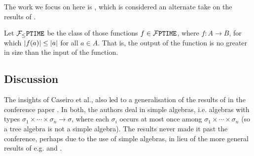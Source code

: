 The work we focus on here is \cite{aehlig-schwichtenberg-2002}, which is
considered an alternate take on the results of \cite{hofmann-2003}.

\begin{definition} Let $\mathcal{F}_{\leq}\mathtt{PTIME}{}$ be the class of those functions $f \in
\mathcal{F}\mathtt{PTIME}{}$, where $f : A \rightarrow B$, for which ${\mathopen{}\left|{f{\mathopen{}\left({a}\right)\mathclose{}}}\right|\mathclose{}} \leq
{\ensuremath{\mathopen{}\left|{a}\right|\mathclose{}}}$ for all $a \in A$. That is, the output of the function is no greater
in size than the input of the function. \end{definition}

\subsection{Discussion}

The insights of Caseiro et al., also led to a generalisation of the results of
\cite{marion-2003} in the conference paper \cite{marion-moyen-2000}. In both,
the authors deal in simple algebras, i.e.  algebras with types $\sigma_1 \times
\cdots \times \sigma_n \rightarrow \sigma$, where each $\sigma_i$ occurs at
most once among $\sigma_1 \times \cdots \times \sigma_n$ (so a tree algebra is
not a simple algebra).  The results never made it past the conference,
perhaps due to the use of simple algebras, in lieu of the more general results
of e.g.  \cite{aehlig-schwichtenberg-2002} and \cite{hofmann-2003}.

